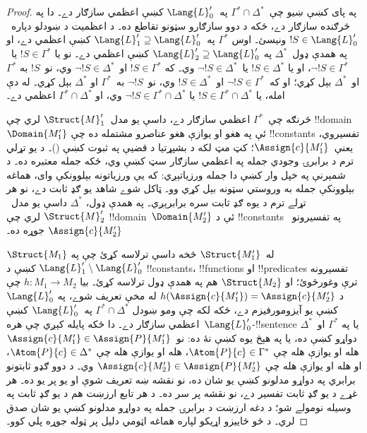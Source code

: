 \documentclass[../../../include/open-logic-section]{subfiles}
\begin{document}
\begin{proof}
په پای کښې ښيو چې~$\Gamma^* \cap \Delta^*$ په~$\Lang{L}'_0$ کښې
اعظمي سازګار دے۔ دا په څرګنده سازګار دے، ځکه د دوو سازګارو سټونو
تقاطع ده۔ د اعظميت د ښودلو دپاره~$!S \in \Lang{L}'_0$ ونيسئ۔ اوس
$\Gamma^*$ په~$\Lang{L}'_1 \supseteq \Lang{L}'_0$ کښې اعظمي دے،
او په همدې ډول~$\Delta^*$ په
$\Lang{L}'_2 \supseteq \Lang{L}'_0$ کښې اعظمي دے۔ نو يا
$!S \in \Gamma^*$ يا~$\lnot !S \in \Gamma^*$، او يا
$!S \in \Delta^*$ يا~$\lnot !S \in \Delta^*$ وي۔ که
$!S \in \Gamma^*$ او~$\lnot !S \in \Delta^*$ وي، نو~$!S$ به
$\Gamma^*$ او~$\Delta^*$ بېل کړي؛ او که~$\lnot !S \in \Gamma^*$
او~$!S \in \Delta^*$ وي، نو~$\lnot !S$ به~$\Gamma^*$ او
$\Delta^*$ بېل کړي۔ له دې امله، يا
$!S \in \Gamma^* \cap \Delta^*$ يا
$\lnot !S \in \Gamma^* \cap \Delta^*$ وي، او
$\Gamma^* \cap \Delta^*$ اعظمي دے۔

څرنګه چې~$\Gamma^*$ اعظمي سازګار دے، داسې يو مدل~$\Struct{M}'_1$
لري چې !!{domain}~$\Domain{M'_1}$ ئې په هغو او يوازې هغو عناصرو
مشتمله ده چې !!{constant}s تفسيروي، يعنې~$\Assign{c}{M'_1}$؛ کټ مټ
لکه د بشپړتيا د قضيې په ثبوت کښې
()۔ د يو تړلي ترم د برابرۍ وجودي جمله په اعظمي سازګار سټ کښې وي، ځکه جمله معتبره ده۔ د شمېرنې په خپل وار کښې دا جمله ورزياتېږي: که يې ورزياتونه بېلوونکې وای، هماغه بېلوونکې جمله به وروستي سټونه بېل کړي وو۔ ټاکل شوے شاهد يو ګډ ثابت دے، نو هر تړلے ترم د يوه ګډ ثابت سره برابرېږي۔ په همدې ډول، $\Delta^*$
داسې يو مدل~$\Struct{M}'_2$ لري چې !!{domain}~$\Domain{M'_2}$ ئې د
!!{constant}s په تفسيرونو~$\Assign{c}{M'_2}$ جوړه ده۔

$\Struct{M_1}$ له~$\Struct{M'_1}$ څخه داسې ترلاسه کړئ چې په
$\Lang{L}'_1 \setminus \Lang{L}'_0$ کښې د !!{constant}s،
!!{function}s او !!{predicate}s تفسيرونه ترې وغورځوئ؛ او
$\Struct{M_2}$ هم په همدې ډول ترلاسه کړئ۔ بيا
$h \colon M_1 \to M_2$ چې د
$h(\Assign{c}{M'_1}) = \Assign{c}{M'_2}$ له مخې تعريف شوے، په
$\Lang{L}'_0$ کښې يو آيزومورفيزم دے، ځکه لکه چې ومو ښودل
$\Gamma^* \cap \Delta^*$ په~$\Lang{L}'_0$ کښې اعظمي سازګار دے۔
دا ځکه پايله کېږي چې هره~$\Lang{L}'_0$-!!{sentence} يا په
$\Gamma^*$ او~$\Delta^*$ دواړو کښې ده، يا په هېڅ يوه کښې نۀ ده:
نو~$\Assign{c}{M'_1} \in \Assign{P}{M'_1}$ هله او يوازې هله چې
$\Atom{P}{c} \in \Gamma^*$، هله او يوازې هله چې
$\Atom{P}{c} \in \Delta^*$، او هله او يوازې هله چې
$\Assign{c}{M'_2} \in \Assign{P}{M'_2}$ وي۔ د دوو ګډو ثابتونو برابري په دواړو مدلونو کښې يو شان ده، نو نقشه ښه تعريف شوې او يو پر يو ده۔ هر غړے د يو ګډ ثابت تفسير دے، نو نقشه پر سر ده۔ د هر تابع ارزښت هم د يو ګډ ثابت په وسيله نومولے شو؛ د دغه ارزښت د برابرۍ جمله په دواړو مدلونو کښې يو شان صدق لري۔ د څو ځاييزو اړيکو لپاره هماغه اټومي دليل پر ټوله جوړه پلي کوو۔


\end{proof}
\end{document}
